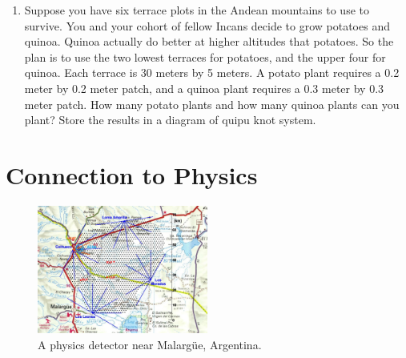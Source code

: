 \documentclass[10pt]{article}
\begin{document}
\begin{enumerate}
\item Suppose you have six terrace plots in the Andean mountains to use to survive.  You and your cohort of fellow Incans decide to grow potatoes and quinoa. Quinoa actually do better at higher altitudes that potatoes.  So the plan is to use the two lowest terraces for potatoes, and the upper four for quinoa.  Each terrace is 30 meters by 5 meters.  A potato plant requires a 0.2 meter by 0.2 meter patch, and a quinoa plant requires a 0.3 meter by 0.3 meter patch.  How many potato plants and how many quinoa plants can you plant? Store the results in a diagram of quipu knot system. \\ \vspace{2.5cm}
\end{enumerate}

\section{Connection to Physics}

\begin{figure}
\centering
\includegraphics[width=0.5\textwidth]{figures/pao.jpg}
\caption{\label{fig:auger} A physics detector near Malarg\"{u}e, Argentina.}
\end{figure}
\end{document}
